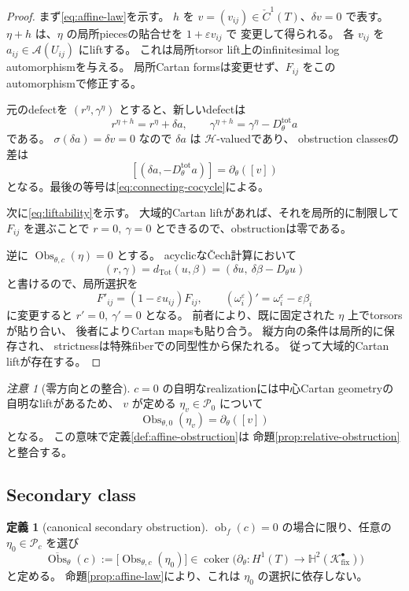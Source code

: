 \documentclass[uplatex,dvipdfmx,11pt]{jsarticle}
\numberwithin{equation}{section}
\theoremstyle{plain}
\theoremstyle{definition}
\newtheorem{definition}[theorem]{定義}
\theoremstyle{remark}
\newtheorem{remark}[theorem]{注意}
\DeclareMathOperator{\coker}{coker}
\DeclareMathOperator{\Obs}{Obs}
\DeclareMathOperator{\obf}{ob}
\newcommand{\shH}{\mathcal H}
\newcommand{\shA}{\mathcal A}
\newcommand{\Kfix}{\mathcal K_{\mathrm{fix}}^\bullet}
\newcommand{\Dtot}{D_\theta^{\mathrm{tot}}}
\newcommand{\Hyp}{\mathbb H}
\begin{document}
\begin{proof}
まず\eqref{eq:affine-law}を示す。
\(h\) を \(v=(v_{ij})\in\check C^1(T)\)、\(\delta v=0\) で表す。
\(\eta+h\) は、\(\eta\) の局所piecesの貼合せを \(1+\varepsilon v_{ij}\) で
変更して得られる。
各 \(v_{ij}\) を \(a_{ij}\in\shA(U_{ij})\) にliftする。
これは局所torsor lift上のinfinitesimal log automorphismを与える。
局所Cartan formsは変更せず、\(F_{ij}\) をこのautomorphismで修正する。

元のdefectを \((r^\eta,\gamma^\eta)\) とすると、新しいdefectは
\[
r^{\eta+h}=r^\eta+\delta a,
\qquad
\gamma^{\eta+h}=\gamma^\eta-\Dtot a
\]
である。
\(\sigma(\delta a)=\delta v=0\) なので \(\delta a\) は \(\shH\)-valuedであり、
obstruction classesの差は
\[
[(\delta a,-\Dtot a)]=\partial_\theta([v])
\]
となる。最後の等号は\eqref{eq:connecting-cocycle}による。

次に\eqref{eq:liftability}を示す。
大域的Cartan liftがあれば、それを局所的に制限して \(F_{ij}\) を選ぶことで
\(r=0,\ \gamma=0\) とできるので、obstructionは零である。

逆に \(\Obs_{\theta,c}(\eta)=0\) とする。
acyclicなČech計算において
\[
(r,\gamma)=d_{\mathrm{Tot}}(u,\beta)=(\delta u,\ \delta\beta-D_\theta u)
\]
と書けるので、局所選択を
\[
F'_{ij}=(1-\varepsilon u_{ij})F_{ij},
\qquad
(\omega_i^\varepsilon)'=\omega_i^\varepsilon-\varepsilon\beta_i
\]
に変更すると \(r'=0,\ \gamma'=0\) となる。
前者により、既に固定された \(\eta\) 上でtorsorsが貼り合い、
後者によりCartan mapsも貼り合う。
縦方向の条件は局所的に保存され、
strictnessは特殊fiberでの同型性から保たれる。
従って大域的Cartan liftが存在する。
\end{proof}

\begin{remark}[零方向との整合]
\label{rem:zero-direction-consistency}
\(c=0\) の自明なrealizationには中心Cartan geometryの自明なliftがあるため、
\(v\) が定める \(\eta_v\in\mathcal P_0\) について
\[
\Obs_{\theta,0}(\eta_v)=\partial_\theta([v])
\]
となる。
この意味で定義\ref{def:affine-obstruction}は
命題\ref{prop:relative-obstruction}と整合する。
\end{remark}

\subsection{Secondary class}

\begin{definition}[canonical secondary obstruction]
\label{def:secondary}
\(\obf_f(c)=0\) の場合に限り、任意の \(\eta_0\in\mathcal P_c\) を選び
\begin{equation}
\label{eq:secondary}
\overline{\Obs}_\theta(c):=
\bigl[\Obs_{\theta,c}(\eta_0)\bigr]
\in\coker\bigl(\partial_\theta:H^1(T)\to\Hyp^2(\Kfix)\bigr)
\end{equation}
と定める。
命題\ref{prop:affine-law}により、これは \(\eta_0\) の選択に依存しない。
\end{definition}
\end{document}
